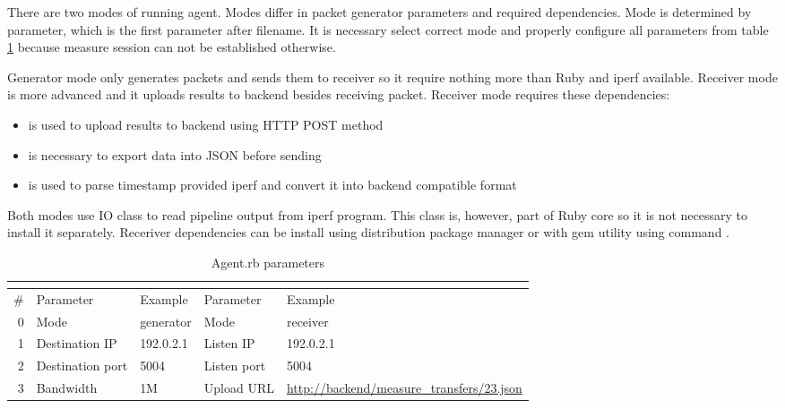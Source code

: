 There are two modes of running agent. Modes differ in packet generator parameters and required dependencies. Mode is determined by  parameter, which is the first parameter after filename. It is necessary select correct mode and properly configure all parameters from table \ref{tab:agent-parameters} because measure session can not be established otherwise. 

Generator mode only generates packets and sends them to receiver so it require nothing more than Ruby and iperf available. Receiver mode is more advanced and it uploads results to backend besides receiving packet. Receiver mode requires these dependencies:
\begin{itemize}
	\item {} is used to upload results to backend using \Ac{HTTP} POST method
	\item {} is necessary to export data into \Ac{JSON} before sending
	\item {} is used to parse timestamp provided iperf and convert it into backend compatible format
\end{itemize}

Both modes use IO class to read pipeline output from iperf program. This class is, however, part of Ruby core so it is not necessary to install it separately. Receriver dependencies can be install using distribution package manager or with gem utility using command .

\begin{table}[htb]
\begin{center}
	\caption{Agent.rb parameters}
	\label{tab:agent-parameters}
	\begin{tabularx}{\textwidth}{|r|l|l||l|X|}
	\multicolumn{3}{c}{\Th{Generator mode}} & \multicolumn{2}{c}{\Th{Receiver mode}} \\
	\hline
	\# & {Parameter} & {Example}  & {Parameter} & {Example} \\
	\hline
	\hline
	0 & Mode & generator & Mode & receiver \\
	\hline
	1 & Destination \Ac{IP} & 192.0.2.1 & Listen \Ac{IP} & 192.0.2.1 \\
	\hline
	2 & Destination port & 5004 & Listen port & 5004 \\
	\hline
	3 & Bandwidth & 1M & Upload \Ac{URL} & \url{http://backend/measure_transfers/23.json} \\
	\hline
	\end{tabularx}
\end{center}
\end{table}


